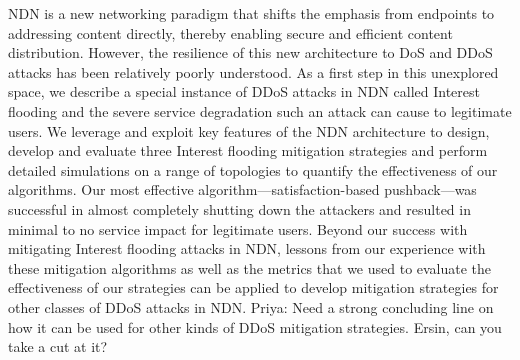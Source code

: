 NDN is a new networking paradigm that shifts the emphasis from endpoints to addressing content directly, thereby enabling secure and efficient content distribution. However, the resilience of this new architecture to DoS and DDoS attacks has been relatively poorly understood. As a first step in this unexplored space, we describe a special instance of DDoS attacks in NDN called Interest flooding and the severe service degradation such an attack can cause to legitimate users. We leverage and exploit key features of the NDN architecture to design, develop and evaluate three Interest flooding mitigation strategies and perform detailed simulations on a range of topologies to quantify the effectiveness of our algorithms. 
Our most effective algorithm---satisfaction-based pushback---was successful in almost completely shutting down the attackers and resulted in minimal to no service impact for legitimate users. 
Beyond our success with mitigating Interest flooding attacks in NDN, lessons from our experience with these mitigation algorithms as well as the metrics that we used to evaluate the effectiveness of our strategies can be applied to develop mitigation strategies for other classes of DDoS attacks in NDN. {\color{red} Priya: Need a  strong concluding line on  how it can be used for other kinds of DDoS mitigation strategies. Ersin, can you take a cut at it?}





